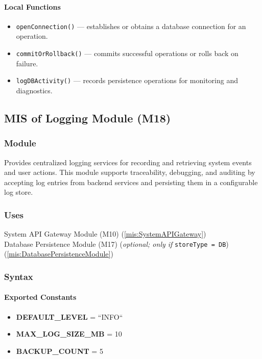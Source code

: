\documentclass[12pt, titlepage]{article}
\begin{document}
\paragraph{Local Functions}
\begin{itemize}
  \item \texttt{openConnection()} — establishes or obtains a database connection for an operation.
  \item \texttt{commitOrRollback()} — commits successful operations or rolls back on failure.
  \item \texttt{logDBActivity()} — records persistence operations for monitoring and diagnostics.
\end{itemize}


\subsection{MIS of Logging Module (M18)}
\label{mis:LoggingModule}

\subsubsection{Module}
Provides centralized logging services for recording and retrieving system events and user actions.
This module supports traceability, debugging, and auditing by accepting log entries from backend services
and persisting them in a configurable log store.

\subsubsection{Uses}
System API Gateway Module (M10)  (\ref{mis:SystemAPIGateway})\\
Database Persistence Module (M17) (\emph{optional; only if} \texttt{storeType = DB}) (\ref{mis:DatabasePersistenceModule})\\

\subsubsection{Syntax}

\paragraph{Exported Constants}
\begin{itemize}
  \item \textbf{DEFAULT\_LEVEL} = ``INFO``
  \item \textbf{MAX\_LOG\_SIZE\_MB} = 10
  \item \textbf{BACKUP\_COUNT} = 5
\end{itemize}
\end{document}

